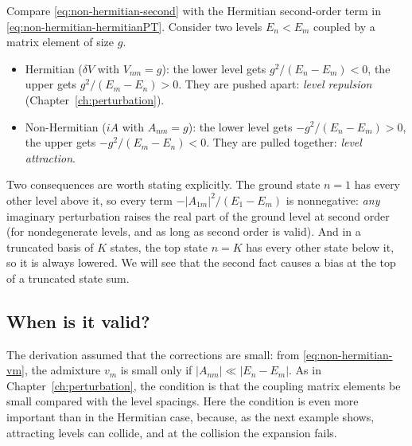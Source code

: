 Compare \eqref{eq:non-hermitian-second} with the Hermitian second-order term in \eqref{eq:non-hermitian-hermitianPT}. Consider two levels $E_n<E_m$ coupled by a matrix element of size $g$.
\begin{itemize}
\item Hermitian ($\delta V$ with $V_{nm}=g$): the lower level gets $g^2/(E_n-E_m)<0$, the upper gets $g^2/(E_m-E_n)>0$. They are pushed apart: \emph{level repulsion} (Chapter~\ref{ch:perturbation}).
\item Non-Hermitian ($iA$ with $A_{nm}=g$): the lower level gets $-g^2/(E_n-E_m)>0$, the upper gets $-g^2/(E_m-E_n)<0$. They are pulled together: \emph{level attraction}.
\end{itemize}
Two consequences are worth stating explicitly. The ground state $n=1$ has every other level above it, so every term $-|A_{1m}|^2/(E_1-E_m)$ is nonnegative: \emph{any} imaginary perturbation raises the real part of the ground level at second order (for nondegenerate levels, and as long as second order is valid). And in a truncated basis of $K$ states, the top state $n=K$ has every other state below it, so it is always lowered. We will see that the second fact causes a bias at the top of a truncated state sum.

\subsection{When is it valid?}

The derivation assumed that the corrections are small: from \eqref{eq:non-hermitian-vm}, the admixture $v_m$ is small only if $|A_{nm}|\ll|E_n-E_m|$. As in Chapter~\ref{ch:perturbation}, the condition is that the coupling matrix elements be small compared with the level spacings. Here the condition is even more important than in the Hermitian case, because, as the next example shows, attracting levels can collide, and at the collision the expansion fails.


